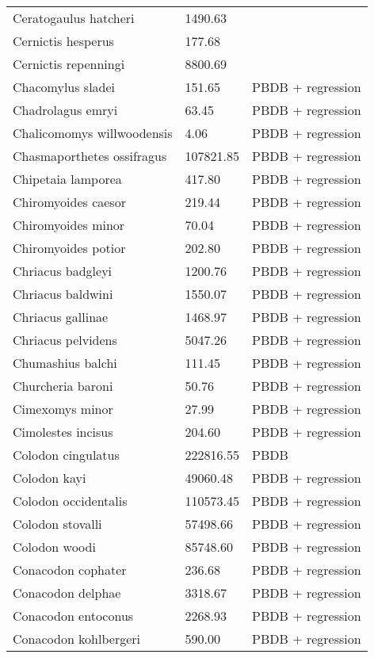 \documentclass{article}
\begin{document}
\begin{center}
\begin{longtable}{p{} p{} p{} }
  Ceratogaulus hatcheri & 1490.63 & \cite{Cassiliano2008} \\ 
  Cernictis hesperus & 177.68 & \cite{Tomiya2013} \\ 
  Cernictis repenningi & 8800.69 & \cite{Hall1930} \\ 
  Chacomylus sladei & 151.65 & PBDB + regression \\ 
  Chadrolagus emryi & 63.45 & PBDB + regression \\ 
  Chalicomomys willwoodensis & 4.06 & PBDB + regression \\ 
  Chasmaporthetes ossifragus & 107821.85 & PBDB + regression \\ 
  Chipetaia lamporea & 417.80 & PBDB + regression \\ 
  Chiromyoides caesor & 219.44 & PBDB + regression \\ 
  Chiromyoides minor & 70.04 & PBDB + regression \\ 
  Chiromyoides potior & 202.80 & PBDB + regression \\ 
  Chriacus badgleyi & 1200.76 & PBDB + regression \\ 
  Chriacus baldwini & 1550.07 & PBDB + regression \\ 
  Chriacus gallinae & 1468.97 & PBDB + regression \\ 
  Chriacus pelvidens & 5047.26 & PBDB + regression \\ 
  Chumashius balchi & 111.45 & PBDB + regression \\ 
  Churcheria baroni & 50.76 & PBDB + regression \\ 
  Cimexomys minor & 27.99 & PBDB + regression \\ 
  Cimolestes incisus & 204.60 & PBDB + regression \\ 
  Colodon cingulatus & 222816.55 & PBDB \\ 
  Colodon kayi & 49060.48 & PBDB + regression \\ 
  Colodon occidentalis & 110573.45 & PBDB + regression \\ 
  Colodon stovalli & 57498.66 & PBDB + regression \\ 
  Colodon woodi & 85748.60 & PBDB + regression \\ 
  Conacodon cophater & 236.68 & PBDB + regression \\ 
  Conacodon delphae & 3318.67 & PBDB + regression \\ 
  Conacodon entoconus & 2268.93 & PBDB + regression \\ 
  Conacodon kohlbergeri & 590.00 & PBDB + regression \\ 

\end{longtable}
\end{center}
\end{document}

